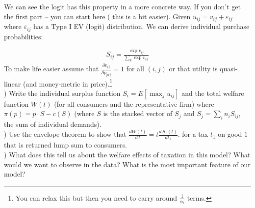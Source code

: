 \documentclass[12pt]{article}
\begin{document}
We can see the logit has this property in a more concrete way. If you don't get the first part -- you can start here ( this is a bit easier). Given $u_{ij} = v_{ij} + \varepsilon_{ij}$ where $\varepsilon_{ij}$ has a Type I EV (logit) distribution. We can derive individual purchase probabilities:

\begin{eqnarray*}
S_{ij} = \frac{\exp v_{ij}}{\sum_k \exp v_{ik}}
\end{eqnarray*}
To make life easier assume that $\frac{\partial v_{ij}}{\partial p_{pij}}=1$ for all $(i,j)$ or that utility is quasi-linear (and money-metric in price).\footnote{You can relax this but then you need to carry around $\frac{1}{\alpha_i}$ terms.}\\

) Write the individual surplus function $S_i = E[\max_j u_{ij}]$ and the total welfare function $W(t)$ (for all consumers and the representative firm) where $\pi(p) = p \cdot S- c(S)$ (where $S$ is the stacked vector of $S_{j}$ and $S_j = \sum_i n_i S_{ij}$, the sum of individual demands).\\


) Use the envelope theorem to show that $\frac{d W(t)}{d\, t} = t \frac{d\, S_1(t)}{d t_1}$. for a tax $t_1$ on good $1$ that is returned lump sum to consumers.\\

) What does this tell us about the welfare effects of taxation in this model? What would we want to observe in the data? What is the most important feature of our model?
\end{document}
